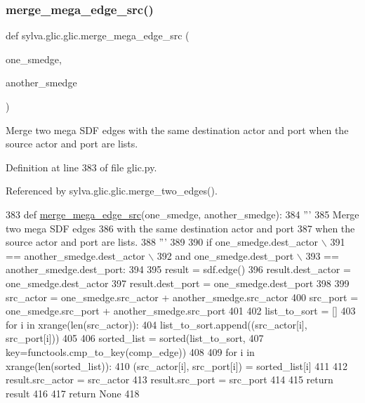 \subsubsection{\texorpdfstring{merge\+\_\+mega\+\_\+edge\+\_\+src()}{merge\_mega\_edge\_src()}}
{\footnotesize\ttfamily def sylva.\+glic.\+glic.\+merge\+\_\+mega\+\_\+edge\+\_\+src (\begin{DoxyParamCaption}\item[{}]{one\+\_\+smedge,  }\item[{}]{another\+\_\+smedge }\end{DoxyParamCaption})}

\begin{DoxyVerb}  Merge two mega SDF edges
  with the same destination actor and port
  when the source actor and port are lists.
\end{DoxyVerb}
 

Definition at line 383 of file glic.\+py.



Referenced by sylva.\+glic.\+glic.\+merge\+\_\+two\+\_\+edges().


\begin{DoxyCode}
383   \textcolor{keyword}{def }\hyperlink{namespacesylva_1_1glic_1_1glic_aa4a9eb6227bd109eec96e5c1ad6579c5}{merge\_mega\_edge\_src}(one\_smedge, another\_smedge):
384     \textcolor{stringliteral}{'''}
385 \textcolor{stringliteral}{      Merge two mega SDF edges}
386 \textcolor{stringliteral}{      with the same destination actor and port}
387 \textcolor{stringliteral}{      when the source actor and port are lists.}
388 \textcolor{stringliteral}{    '''}
389 
390     \textcolor{keywordflow}{if} one\_smedge.dest\_actor \(\backslash\)
391             == another\_smedge.dest\_actor \(\backslash\)
392             \textcolor{keywordflow}{and} one\_smedge.dest\_port \(\backslash\)
393             == another\_smedge.dest\_port:
394 
395       result = sdf.edge()
396       result.dest\_actor = one\_smedge.dest\_actor
397       result.dest\_port = one\_smedge.dest\_port
398 
399       src\_actor = one\_smedge.src\_actor + another\_smedge.src\_actor
400       src\_port = one\_smedge.src\_port + another\_smedge.src\_port
401 
402       list\_to\_sort = []
403       \textcolor{keywordflow}{for} i \textcolor{keywordflow}{in} xrange(len(src\_actor)):
404         list\_to\_sort.append((src\_actor[i], src\_port[i]))
405 
406       sorted\_list = sorted(list\_to\_sort,
407                            key=functools.cmp\_to\_key(comp\_edge))
408 
409       \textcolor{keywordflow}{for} i \textcolor{keywordflow}{in} xrange(len(sorted\_list)):
410         (src\_actor[i], src\_port[i]) = sorted\_list[i]
411 
412       result.src\_actor = src\_actor
413       result.src\_port = src\_port
414 
415       \textcolor{keywordflow}{return} result
416 
417     \textcolor{keywordflow}{return} \textcolor{keywordtype}{None}
418 
\end{DoxyCode}
\mbox{\label{namespacesylva_1_1glic_1_1glic_a1d03fa1322fc331579ff650ea5612ce8}} 
